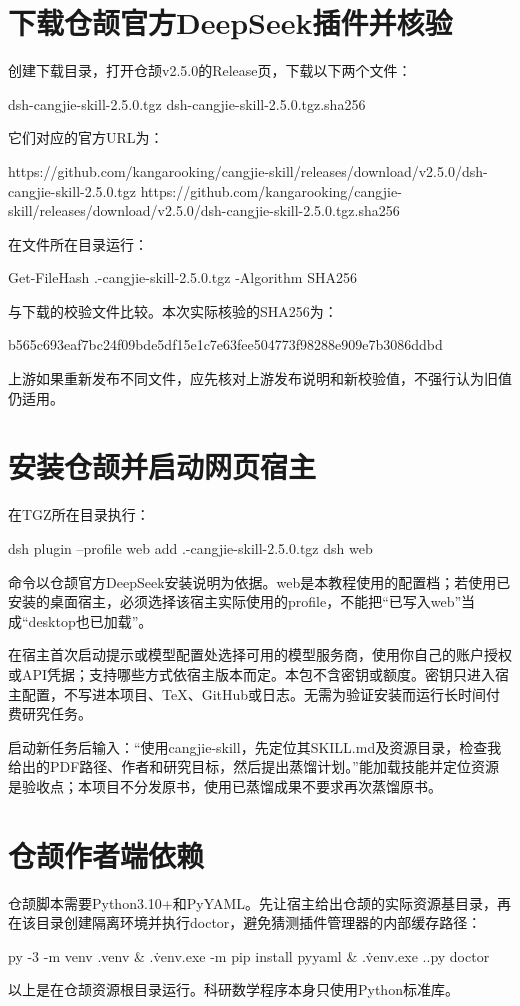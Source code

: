 \documentclass[UTF8,fontset=fandol,zihao=-4]{ctexrep}
\begin{document}
\section{下载仓颉官方DeepSeek插件并核验}
创建下载目录，打开仓颉v2.5.0的Release页，下载以下两个文件：
\begin{code}
dsh-cangjie-skill-2.5.0.tgz
dsh-cangjie-skill-2.5.0.tgz.sha256
\end{code}
它们对应的官方URL为：
\begin{code}
https://github.com/kangarooking/cangjie-skill/releases/download/v2.5.0/dsh-cangjie-skill-2.5.0.tgz
https://github.com/kangarooking/cangjie-skill/releases/download/v2.5.0/dsh-cangjie-skill-2.5.0.tgz.sha256
\end{code}
在文件所在目录运行：
\begin{code}
Get-FileHash .\dsh-cangjie-skill-2.5.0.tgz -Algorithm SHA256
\end{code}
与下载的校验文件比较。本次实际核验的SHA256为：
\begin{code}
b565c693eaf7bc24f09bde5df15e1c7e63fee504773f98288e909e7b3086ddbd
\end{code}
上游如果重新发布不同文件，应先核对上游发布说明和新校验值，不强行认为旧值仍适用。

\section{安装仓颉并启动网页宿主}
在TGZ所在目录执行：
\begin{code}
dsh plugin --profile web add .\dsh-cangjie-skill-2.5.0.tgz
dsh web
\end{code}
命令以仓颉官方DeepSeek安装说明为依据。web是本教程使用的配置档；若使用已安装的桌面宿主，必须选择该宿主实际使用的profile，不能把“已写入web”当成“desktop也已加载”。

在宿主首次启动提示或模型配置处选择可用的模型服务商，使用你自己的账户授权或API凭据；支持哪些方式依宿主版本而定。本包不含密钥或额度。密钥只进入宿主配置，不写进本项目、TeX、GitHub或日志。无需为验证安装而运行长时间付费研究任务。

启动新任务后输入：“使用cangjie-skill，先定位其SKILL.md及资源目录，检查我给出的PDF路径、作者和研究目标，然后提出蒸馏计划。”能加载技能并定位资源是验收点；本项目不分发原书，使用已蒸馏成果不要求再次蒸馏原书。

\section{仓颉作者端依赖}
仓颉脚本需要Python3.10+和PyYAML。先让宿主给出仓颉的实际资源基目录，再在该目录创建隔离环境并执行doctor，避免猜测插件管理器的内部缓存路径：
\begin{code}
py -3 -m venv .venv
& .\.venv\Scripts\python.exe -m pip install pyyaml
& .\.venv\Scripts\python.exe .\scripts\cangjie.py doctor
\end{code}
以上是在仓颉资源根目录运行。科研数学程序本身只使用Python标准库。
\end{document}
